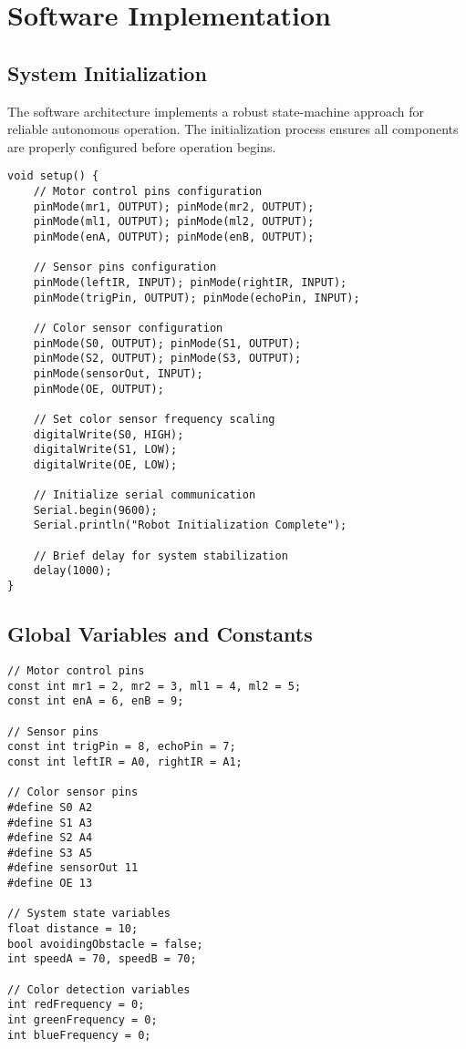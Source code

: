 \documentclass[12pt,a4paper]{article}
\begin{document}
\section{Software Implementation}

\subsection{System Initialization}

The software architecture implements a robust state-machine approach for reliable autonomous operation. The initialization process ensures all components are properly configured before operation begins.

\begin{lstlisting}[caption={System Initialization Code}, label={lst:init}]
void setup() {
    // Motor control pins configuration
    pinMode(mr1, OUTPUT); pinMode(mr2, OUTPUT);
    pinMode(ml1, OUTPUT); pinMode(ml2, OUTPUT);
    pinMode(enA, OUTPUT); pinMode(enB, OUTPUT);
    
    // Sensor pins configuration
    pinMode(leftIR, INPUT); pinMode(rightIR, INPUT);
    pinMode(trigPin, OUTPUT); pinMode(echoPin, INPUT);
    
    // Color sensor configuration
    pinMode(S0, OUTPUT); pinMode(S1, OUTPUT);
    pinMode(S2, OUTPUT); pinMode(S3, OUTPUT);
    pinMode(sensorOut, INPUT);
    pinMode(OE, OUTPUT);
    
    // Set color sensor frequency scaling
    digitalWrite(S0, HIGH);
    digitalWrite(S1, LOW);
    digitalWrite(OE, LOW);
    
    // Initialize serial communication
    Serial.begin(9600);
    Serial.println("Robot Initialization Complete");
    
    // Brief delay for system stabilization
    delay(1000);
}
\end{lstlisting}

\subsection{Global Variables and Constants}

\begin{lstlisting}[caption={Global Variables Declaration}, label={lst:globals}]
// Motor control pins
const int mr1 = 2, mr2 = 3, ml1 = 4, ml2 = 5;
const int enA = 6, enB = 9;

// Sensor pins
const int trigPin = 8, echoPin = 7;
const int leftIR = A0, rightIR = A1;

// Color sensor pins
#define S0 A2
#define S1 A3
#define S2 A4
#define S3 A5
#define sensorOut 11
#define OE 13

// System state variables
float distance = 10;
bool avoidingObstacle = false;
int speedA = 70, speedB = 70;

// Color detection variables
int redFrequency = 0;
int greenFrequency = 0;
int blueFrequency = 0;
\end{lstlisting}
\end{document}
